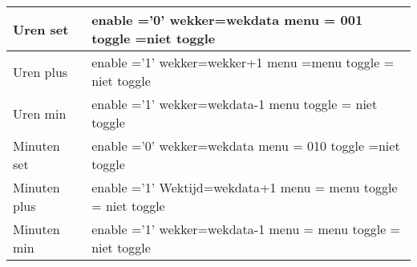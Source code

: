 \documentclass[a4paper, oneside, 10pt]{article}
\begin{document}
\begin{longtable}{|l| p{10cm} |}
Uren set &
enable ='0' \newline
wekker=wekdata \newline
menu = 001 \newline
toggle =niet toggle \\ \hline
Uren plus &
enable ='1' \newline
wekker=wekker+1 \newline
menu =menu \newline
toggle = niet toggle \\ \hline
Uren min &
enable ='1' \newline
wekker=wekdata-1 \newline
menu \newline
toggle = niet toggle \\ \hline
Minuten set &
enable ='0' \newline
wekker=wekdata \newline
menu = 010 \newline
toggle =niet toggle \\ \hline
Minuten plus &
enable ='1' \newline
Wektijd=wekdata+1 \newline
menu = menu \newline
toggle = niet toggle \\ \hline
Minuten min &
enable ='1' \newline
wekker=wekdata-1 \newline
menu = menu \newline
toggle = niet toggle \\ \hline
\end{longtable}
\end{document}
